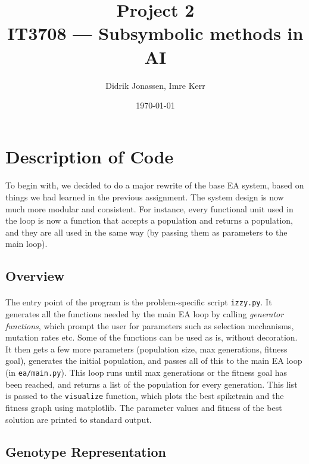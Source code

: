 \documentclass[a4paper,12pt]{article}
\author{Didrik Jonassen, Imre Kerr\vspace{-2ex}}
\title{\vspace{-5ex}Project 2\\ IT3708 --- Subsymbolic methods in AI}
\date{\today}
\begin{document}
\maketitle

\section{Description of Code}

\paragraph{}To begin with, we decided to do a major rewrite of the base EA system, based on things we had learned in the previous assignment. The system design is now much more modular and consistent. For instance, every functional unit used in the loop is now a function that accepts a population and returns a population, and they are all used in the same way (by passing them as parameters to the main loop).

\subsection{Overview}
\paragraph{}The entry point of the program is the problem-specific script \texttt{izzy.py}. It generates all the functions needed by the main EA loop by calling \textit{generator functions}, which prompt the user for parameters such as selection mechanisms, mutation rates etc. Some of the functions can be used as is, without decoration. It then gets a few more parameters (population size, max generations, fitness goal), generates the initial population, and passes all of this to the main EA loop (in \texttt{ea/main.py}). This loop runs until max generations or the fitness goal has been reached, and returns a list of the population for every generation. This list is passed to the \texttt{visualize} function, which plots the best spiketrain and the fitness graph using matplotlib. The parameter values and fitness of the best solution are printed to standard output.

\subsection{Genotype Representation}
\end{document}
